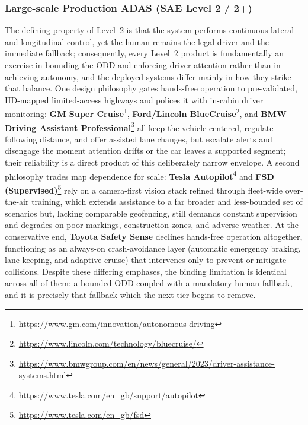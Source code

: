 \subsubsection{Large-scale Production ADAS (SAE Level 2 / 2+)}
The defining property of Level~2 is that the system performs continuous lateral and longitudinal control, yet the human remains the legal driver and the immediate fallback; consequently, every Level~2 product is fundamentally an exercise in bounding the ODD and enforcing driver attention rather than in achieving autonomy, and the deployed systems differ mainly in how they strike that balance.
One design philosophy gates hands-free operation to pre-validated, HD-mapped limited-access highways and polices it with in-cabin driver monitoring: \textbf{GM Super Cruise}\footnote{\url{https://www.gm.com/innovation/autonomous-driving}}, \textbf{Ford/Lincoln BlueCruise}\footnote{\url{https://www.lincoln.com/technology/bluecruise/}}, and \textbf{BMW Driving Assistant Professional}\footnote{\url{https://www.bmwgroup.com/en/news/general/2023/driver-assistance-systems.html}} all keep the vehicle centered, regulate following distance, and offer assisted lane changes, but escalate alerts and disengage the moment attention drifts or the car leaves a supported segment; their reliability is a direct product of this deliberately narrow envelope.
A second philosophy trades map dependence for scale: \textbf{Tesla Autopilot}\footnote{\url{https://www.tesla.com/en_gb/support/autopilot}} and \textbf{FSD (Supervised)}\footnote{\url{https://www.tesla.com/en_gb/fsd}} rely on a camera-first vision stack refined through fleet-wide over-the-air training, which extends assistance to a far broader and less-bounded set of scenarios but, lacking comparable geofencing, still demands constant supervision and degrades on poor markings, construction zones, and adverse weather. At the conservative end, \textbf{Toyota Safety Sense} declines hands-free operation altogether, functioning as an always-on crash-avoidance layer (automatic emergency braking, lane-keeping, and adaptive cruise) that intervenes only to prevent or mitigate collisions. Despite these differing emphases, the binding limitation is identical across all of them: a bounded ODD coupled with a mandatory human fallback, and it is precisely that fallback which the next tier begins to remove.

